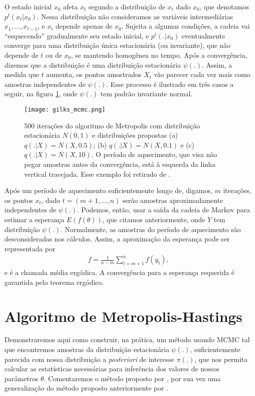 \documentclass[
	12pt,				%
	openright,			%
	twoside,			%
	a4paper,			%
	english,			%
	brazil				%
	]{abntex2}
\begin{document}
\begin{anexosenv}
 O estado inicial $x_{0}$ afeta $x_{t}$ segundo a distribuição de $x_{t}$ dado $x_{0}$, que denotamos $p^{t}(x_{t}|x_{0})$. Nessa distribuição não consideramos as variáveis intermediárias $x_{1}, ..., x_{t-1}$, e $x_{t}$ depende apenas de $x_{0}$. Sujeita a algumas condições, a cadeia vai ``esquecendo'' gradualmente seu estado inicial, e $p^{t}(.|x_{0})$ eventualmente converge para uma distribuição única estacionária (ou invariante), que não depende de $t$ ou de $x_{0}$, se mantendo homogênea no tempo. Após a convergência, dizemos que a distribuição é uma distribuição estacionária $\psi(.)$. Assim, a medida que $t$ aumenta, os pontos amostrados ${X_{t}}$ vão parecer cada vez mais como amostras independentes de $\psi(.)$. Esse processo é ilustrado em três casos a seguir, na figura \ref{fig:gilksmcmc}, onde $\psi(.)$ tem padrão invariante normal.

 \begin{figure}[!htbp]
    \centering
    \texttt{[image: gilks\_mcmc.png]}
    \caption{500 iterações do algoritmo de Metropolis com distribuição estacionária $N(0,1)$ e distribuições propostas (a) $q(.|X) = N(X, 0.5)$; (b) $q(.|X) = N(X, 0.1)$ e (c) $q(.|X) = N(X, 10)$. O período de aquecimento, que visa não pegar amostras antes da convergência, está à esquerda da linha vertical tracejada. Esse exemplo foi retirado de \cite[p.~6]{gilks1996}.}
    \label{fig:gilksmcmc}
 \end{figure}
 
 Após um período de aquecimento suficientemente longo de, digamos, $m$ iterações, os pontos $x_{t}$, dado $t = (m+1, ..., n)$ serão amostras aproximadamente independentes de $\psi(.)$. Podemos, então, usar a saída da cadeia de Markov para estimar a esperança $E(f(\theta))$, que citamos anteriormente, onde $Y$ tem distribuição $\psi(.)$. Normalmente, as amostras do período de aquecimento são desconsideradas nos cálculos. Assim, a aproximação da esperança pode ser representada por
 \begin{equation}
    \begin{aligned}
        f = \frac{1}{n-m} \sum_{t = m+1}^{n} f(y_{t}),
     \end{aligned}
 \end{equation}
 e é a chamada média ergódica. A convergência para a esperança requerida é garantida pelo teorema ergódico.
 
 \section{Algoritmo de Metropolis-Hastings}
 Demonstraremos aqui como construir, na prática, um método usando MCMC tal que encontremos amostras da distribuição estacionária $\psi(.)$, suficientemente parecida com nossa distribuição a \emph{posteriori} de interesse $\pi(.)$, que nos permita calcular as estatísticas necessárias para inferência dos valores de nossos parâmetros $\theta$. Comentaremos o método proposto por , por sua vez uma generalização do método proposto anteriormente por .
 

\end{anexosenv}
\end{document}

